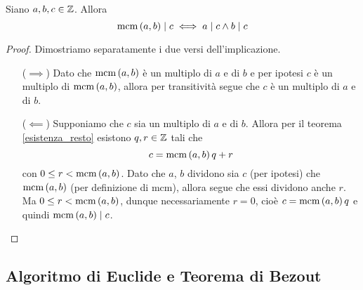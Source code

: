 \begin{proposition}\label{mcm|c_iff_a,b|c}
    Siano $a, b, c \in \mathbb{Z}$. Allora \begin{equation}
        \operatorname{mcm}\left(a, b\right) \mid c \iff a \mid c \land b \mid c
    \end{equation}
\end{proposition}
\begin{proof}
    Dimostriamo separatamente i due versi dell'implicazione.
    \begin{itemize}
        \item[($\implies$)] Dato che $\operatorname{mcm}\left(a, b\right)$ è un multiplo di $a$ e di $b$ e per ipotesi $c$ è un multiplo di $\operatorname{mcm}\left(a, b\right)$, allora per transitività segue che $c$ è un multiplo di $a$ e di $b$.
        \item[($\impliedby$)] Supponiamo che $c$ sia un multiplo di $a$ e di $b$. Allora per il teorema \ref{esistenza_resto} esistono $q, r \in \mathbb{Z}$ tali che \[
        c = \operatorname{mcm}\left(a, b\right)q + r
    \]
    con $0 \leq r < \operatorname{mcm}\left(a, b\right)$.
    Dato che $a$, $b$ dividono sia $c$ (per ipotesi) che $\operatorname{mcm}\left(a, b\right)$ (per definizione di mcm), allora segue che essi dividono anche $r$. Ma $0 \leq r < \operatorname{mcm}\left(a, b\right)$, dunque necessariamente $r = 0$, cioè $c = \operatorname{mcm}\left(a, b\right)q$ e quindi $\operatorname{mcm}\left(a, b\right) \mid c$. \qedhere
    \end{itemize}
\end{proof}


\subsection{Algoritmo di Euclide e Teorema di Bezout}

